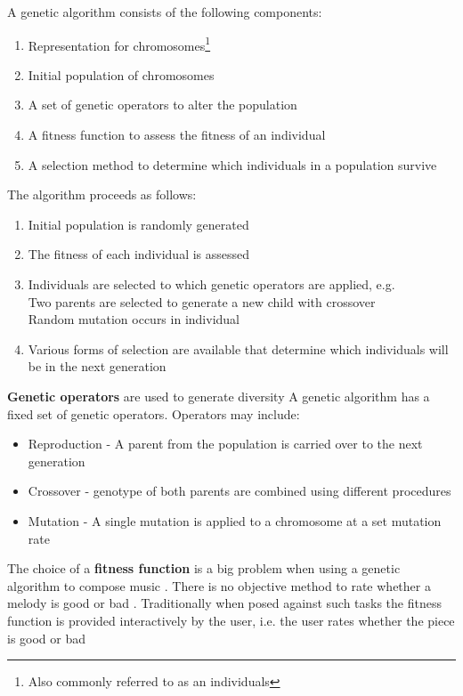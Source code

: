 A genetic algorithm consists of the following components:
\begin{enumerate}
\item Representation for chromosomes\footnote{Also commonly referred to as an individuals}
\item Initial population of chromosomes
\item A set of genetic operators to alter the population
\item A fitness function to assess the fitness of an individual
\item A selection method to determine which individuals in a population survive
\end{enumerate}
The algorithm proceeds as follows:
\begin{enumerate}
\item Initial population is randomly generated
\item The fitness of each individual is assessed
\item Individuals are selected to which genetic operators are applied, e.g.
\\Two parents are selected to generate a new child with crossover
\\Random mutation occurs in individual
\item Various forms of selection are available that determine which individuals will be in the next generation
\end{enumerate}

\textbf{Genetic operators} are used to generate diversity A genetic algorithm has a fixed set of genetic operators. Operators may include:
\begin{itemize}
\item Reproduction - A parent from the population is carried over to the next generation
\item Crossover - genotype of both parents are combined using different procedures
\item Mutation - A single mutation is applied to a chromosome at a set mutation rate
\end{itemize}

The choice of a \textbf{fitness function} is a big problem when using a genetic algorithm to compose music \cite{Wiggins1998,Matic2010}. There is no objective method to rate whether a melody is good or bad \cite{Lo2012}. 
Traditionally when posed against such tasks the fitness function is provided interactively by the user, i.e. the user rates whether the piece is good or bad

